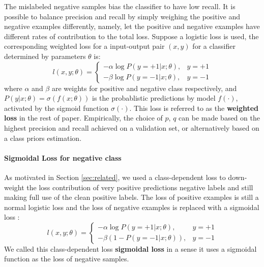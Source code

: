 The mislabeled negative samples bias the classifier to have low recall.
It is possible to balance precision and recall by simply weighing the positive and negative examples differently, namely, let the positive and negative examples have different rates of contribution to the total loss.
Suppose a logistic loss is used, the corresponding weighted loss for a input-output pair $(x, y)$ for a classifier determined by parameters $\theta$ is:
\[
  l(x, y; \theta) =
    \begin{cases}
      - \alpha \log P(y=+1 \vert x; \theta), & y = +1 \\
      - \beta \log P(y=-1 \vert x; \theta), & y = -1
    \end{cases}
\]
where $\alpha$ and $\beta$ are weights for positive and negative class respectively, and $P(y\vert x; \theta)=\sigma(f(x; \theta))$ is the probablistic predictions by model $f(\cdot)$, activated by the sigmoid function $\sigma(\cdot)$.
This loss is referred to as the \textbf{weighted loss} in the rest of paper.
Empirically, the choice of $p$, $q$ can be made based on the highest precision and recall achieved on a validation set, or alternatively based on a class priors estimation\cite{du2014class}.



\paragraph{Sigmoidal Loss for negative class}

As motivated in Section \ref{sec:related}, we used a class-dependent loss to down-weight the loss contribution of very positive predictions negative labels and still making full use of the clean positive labels.
The loss of positive examples is still a normal logistic loss and the loss of negative examples is replaced with a sigmoidal loss \cite{tax2016class}:
\[
  l(x, y; \theta) =
    \begin{cases}
      - \alpha \log P(y=+1 \vert x; \theta), & y = +1 \\
      - \beta (1 - P(y=-1 \vert x; \theta)), & y = -1
    \end{cases}
\]
We called this class-dependent loss \textbf{sigmoidal loss} in a sense it uses a sigmoidal function as the loss of negative samples.

